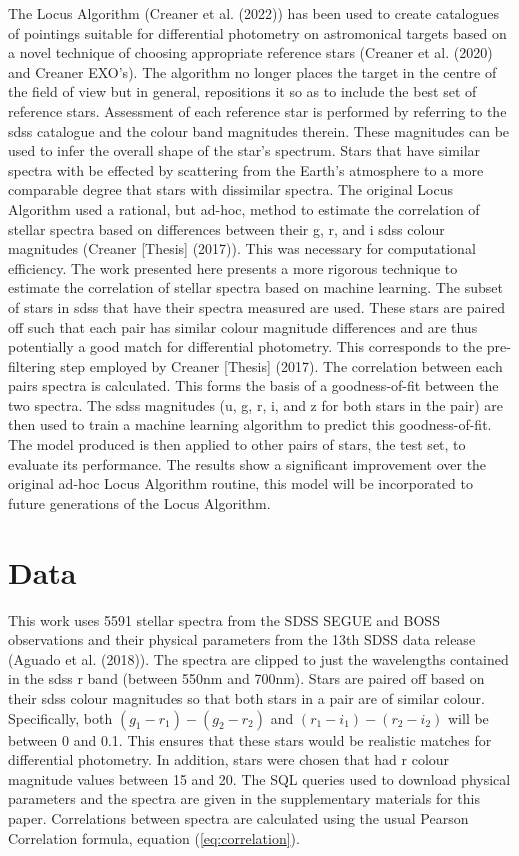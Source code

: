 \documentclass[]{elsarticle} %
\begin{document}
The Locus Algorithm (Creaner et al. (2022)) has been used to create
catalogues of pointings suitable for differential photometry on
astromonical targets based on a novel technique of choosing appropriate
reference stars (Creaner et al. (2020) and Creaner EXO's). The algorithm
no longer places the target in the centre of the field of view but in
general, repositions it so as to include the best set of reference
stars. Assessment of each reference star is performed by referring to
the sdss catalogue and the colour band magnitudes therein. These
magnitudes can be used to infer the overall shape of the star's
spectrum. Stars that have similar spectra with be effected by scattering
from the Earth's atmosphere to a more comparable degree that stars with
dissimilar spectra. The original Locus Algorithm used a rational, but
ad-hoc, method to estimate the correlation of stellar spectra based on
differences between their g, r, and i sdss colour magnitudes (Creaner
{[}Thesis{]} (2017)). This was necessary for computational efficiency.
The work presented here presents a more rigorous technique to estimate
the correlation of stellar spectra based on machine learning. The subset
of stars in sdss that have their spectra measured are used. These stars
are paired off such that each pair has similar colour magnitude
differences and are thus potentially a good match for differential
photometry. This corresponds to the pre-filtering step employed by
Creaner {[}Thesis{]} (2017). The correlation between each pairs spectra
is calculated. This forms the basis of a goodness-of-fit between the two
spectra. The sdss magnitudes (u, g, r, i, and z for both stars in the
pair) are then used to train a machine learning algorithm to predict
this goodness-of-fit. The model produced is then applied to other pairs
of stars, the test set, to evaluate its performance. The results show a
significant improvement over the original ad-hoc Locus Algorithm
routine, this model will be incorporated to future generations of the
Locus Algorithm.

\hypertarget{data}{%
\section{Data}\label{data}}

This work uses 5591 stellar spectra from the SDSS SEGUE and BOSS
observations and their physical parameters from the 13th SDSS data
release (Aguado et al. (2018)). The spectra are clipped to just the
wavelengths contained in the sdss r band (between 550nm and 700nm).
Stars are paired off based on their sdss colour magnitudes so that both
stars in a pair are of similar colour. Specifically, both
\((g_1-r_1)-(g_2-r_2)\) and \((r_1-i_1)-(r_2-i_2)\) will be between 0
and 0.1. This ensures that these stars would be realistic matches for
differential photometry. In addition, stars were chosen that had r
colour magnitude values between 15 and 20. The SQL queries used to
download physical parameters and the spectra are given in the
supplementary materials for this paper. Correlations between spectra are
calculated using the usual Pearson Correlation formula, equation
(\ref{eq:correlation}).
\end{document}
